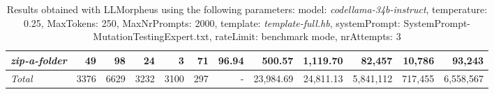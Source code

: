 \begin{table*}
{\begin{tabular}{l||r|r|r|r|r|r||r|r||r|r|r}
   \hline
   \textit{zip-a-folder} & 49 & 98 & 24 & 3 & 71 & 96.94 & 500.57 & 1,119.70 & 82,457 & 10,786 & 93,243 \\ 
   \hline
   \textit{Total} & 3376 & 6629 & 3232 & 3100 & 297 & - & 23,984.69  & 24,811.13 & 5,841,112 & 717,455 & 6,558,567 \\ 
 \end{tabular}
 }
 \caption{Results obtained with LLMorpheus using the following parameters: 
   model: \textit{codellama-34b-instruct}, 
   temperature: 0.25, 
   MaxTokens: 250, 
   MaxNrPrompts: 2000, 
   template: \textit{template-full.hb}, 
   systemPrompt: SystemPrompt-MutationTestingExpert.txt, 
   rateLimit: benchmark mode, 
   nrAttempts: 3  
 }
\end{table*}

